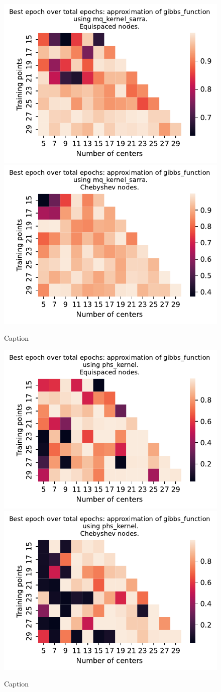 \documentclass[12pt]{report} %
\begin{document}
\begin{figure}[ht]
  \centering

  \includegraphics[width=.49\textwidth]{imagenes/experiments/1d/variational_epochs/gibbs_function-Kmq_kernel_sarra-Equi-epochs.pdf}
  \includegraphics[width=.49\textwidth]{imagenes/experiments/1d/variational_epochs/gibbs_function-Kmq_kernel_sarra-Cheb-epochs.pdf}
  \caption{Caption}
  \label{fig:epochs-gibbs-sarra}
\end{figure}

\begin{figure}[ht]
  \centering

  \includegraphics[width=.49\textwidth]{imagenes/experiments/1d/variational_epochs/gibbs_function-Kphs_kernel-Equi-epochs.pdf}
  \includegraphics[width=.49\textwidth]{imagenes/experiments/1d/variational_epochs/gibbs_function-Kphs_kernel-Cheb-epochs.pdf}
  \caption{Caption}
  \label{fig:epochs-gibbs-phs}
\end{figure}
\end{document}
